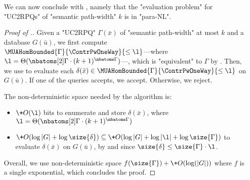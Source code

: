 We can now conclude with , namely that the "evaluation problem" for "UC2RPQs" of
"semantic path-width" $k$ is in "para-NL".
\begin{proof}[Proof of .]
	Given a "UC2RPQ"
	$\Gamma(\bar x)$ of "semantic path-width" at most $k$ and a database $G(\bar u)$, we
	first compute $\MUAHomBounded{\Gamma}{\ContrPwOneWay}{\leq\l}$---where $\l = \lbound{k}{\Gamma}$---, which is "equivalent" to
	$\Gamma$ by .
	Then, we use  to evaluate each
	$\delta(\bar x) \in \MUAHomBounded{\Gamma}{\ContrPwOneWay}{\leq\l}$ on $G(\bar u)$.
	If one of the queries accepts, we accept. Otherwise, we reject.

	The non-deterministic space needed by the algorithm is:
	\begin{itemize}
		\item $\+O(\l)$ bits to enumerate and store $\delta(\bar x)$, where $\l = \lbound{k}{\Gamma} $ 
		\item $\+O(\log{|G|} + \log{\size{\delta}}) \subseteq \+O(\log{|G|} + \log{|\l|} + \log{\size{\Gamma}})$ to evaluate
		$\delta(\bar x)$ on $G(\bar u)$, by 
		and since $\size{\delta} \leq \size{\Gamma}\cdot \l$.
	\end{itemize}
	Overall, we use non-deterministic space $f(\size{\Gamma}) + \+O(\log(|G|))$
	where $f$ is a single exponential, which concludes the proof.
\end{proof}